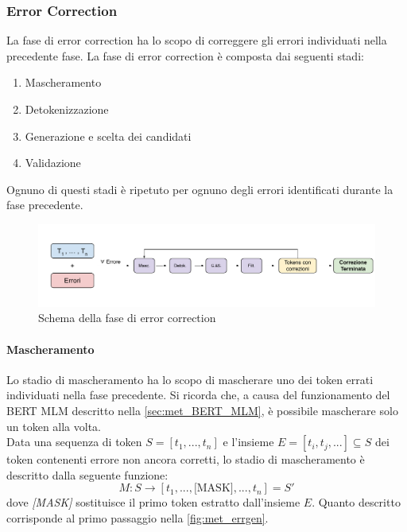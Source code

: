 \subsubsection{Error Correction}
\label{sec:met_errcor}

La fase di error correction ha lo scopo di correggere gli errori individuati nella precedente fase. La fase di error correction è composta dai seguenti stadi:

\begin{enumerate}
\item Mascheramento
\item Detokenizzazione
\item Generazione e scelta dei candidati
\item Validazione
\end{enumerate}

Ognuno di questi stadi è ripetuto per ognuno degli errori identificati durante la fase precedente.

\begin{figure}[H]
\centering
\includegraphics[width=\textwidth]{immagini/metodologia/tok_correction}
\caption{Schema della fase di error correction}
\label{fig:met_tok_correction}
\end{figure}



\paragraph{Mascheramento}
Lo stadio di mascheramento ha lo scopo di mascherare uno dei token errati individuati nella fase precedente. Si ricorda che, a causa del funzionamento del BERT MLM descritto nella \autoref{sec:met_BERT_MLM}, è possibile mascherare solo un token alla volta.\\
Data una sequenza di token $S = [t_1,...,t_n]$ e l'insieme $E = [t_i,t_j,...]\subseteq S$ dei token contenenti errore non ancora corretti, lo stadio di mascheramento è descritto dalla seguente funzione:
\begin{equation}
M: S \rightarrow [t_1,...,\text{[MASK]},...,t_n] = S\prime
\end{equation}
dove \textit{[MASK]} sostituisce il primo token estratto dall'insieme $E$. Quanto descritto corrisponde al primo passaggio nella \autoref{fig:met_errgen}.


